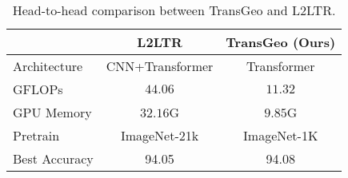\documentclass[10pt,twocolumn,letterpaper]{article}
\begin{document}
\begin{table}[!htbp]
    \centering
    \begin{tabular}{l|c |c}
    \hline
    
    \hline
       &  L2LTR\cite{yang2021cross}  & \textbf{TransGeo} (Ours) \\
      \hline
     Architecture    & CNN+Transformer  & Transformer \\
    GFLOPs & $44.06$ & $11.32$ \\
    GPU Memory & $32.16$G & $9.85$G \\
    Pretrain & ImageNet-21k & ImageNet-1K \\
    \hline
Best Accuracy & 94.05 & 94.08 \\
    \hline
    
    \hline
    \end{tabular}
    \caption{Head-to-head comparison between TransGeo and L2LTR.}
    \label{tab:head}
\end{table}
\end{document}
